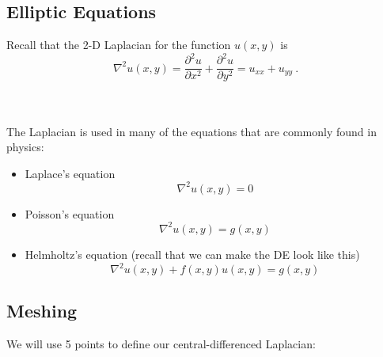 \documentclass[12pt]{exam}
\begin{document}
\subsection*{Elliptic Equations}

Recall that the 2-D Laplacian for the function $u(x,y)$ is
%
\ifprintanswers
\begin{equation}
\nabla^2 u(x,y) = \frac{\partial^2 u}{\partial x^2} + \frac{\partial^2 u}{\partial y^2} = u_{xx} + u_{yy} \:.\nonumber
\end{equation}
\else
\\ \vspace*{3em} \\
\fi

%
The Laplacian is used in many of the equations that are commonly found in physics:
%
\begin{itemize}
\item Laplace's equation
\[\nabla^2 u(x,y) = 0\]

\item Poisson's equation 
\[\nabla^2 u(x,y) = g(x,y)\]

\item Helmholtz's equation (recall that we can make the DE look like this)
\[\nabla^2 u(x,y) +f(x,y)u(x,y) = g(x,y)\]
\end{itemize}

\subsection*{Meshing}

We will use 5 points to define our central-differenced Laplacian:
\end{document}
